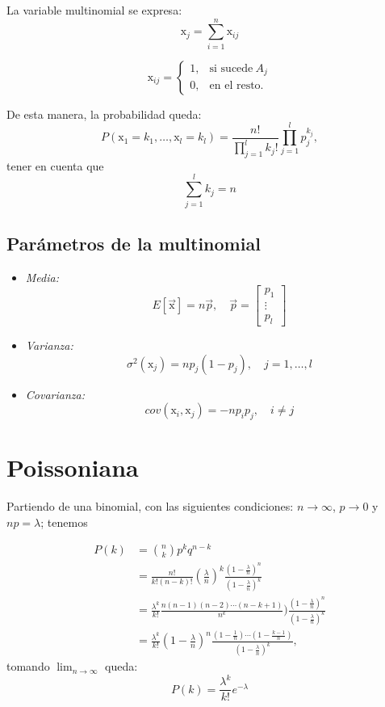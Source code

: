 \documentclass[openany]{book}
\begin{document}
La variable multinomial se expresa:
\begin{equation*}
  \mathrm{x}_{j}=\sum_{i=1}^{n}\mathrm{x}_{ij}
\end{equation*}

\begin{equation*}
  \mathrm{x}_{ij} = \begin{cases}
    1, & \text{si sucede}~ A_{j}\\
    0, & \text{en el resto.}
  \end{cases}
\end{equation*}

\par De esta manera, la probabilidad queda:
\begin{equation}
  \label{eq:prob-multinomial}
  P(\mathrm{x}_1=k_1,\dots,\mathrm{x}_l=k_{l})=\frac{n!}{\prod_{j=1}^{l}k_{j}!}\prod_{j=1}^{l}p^{k_{j}}_{j},
\end{equation}
tener en cuenta que $$\sum_{j=1}^{l}k_{j}=n$$

\subsection{Parámetros de la multinomial}
\begin{itemize}
  \item \emph{Media:}$$E\left[\vec{\mathrm{x}}\right]=n\vec{p},\quad\vec{p}=\begin{bmatrix}p_{1}\\
  \vdots\\
  p_{l}\end{bmatrix}$$
  \item \emph{Varianza:}$$\sigma^{2}(\mathrm{x}_{j})=np_{j}(1-p_{j}),\quad j=1,\dots,l$$
  \item \emph{Covarianza:}$$cov(\mathrm{x}_{i},\mathrm{x}_{j})=-np_{i}p_{j},\quad i\neq j$$
\end{itemize}

\section{Poissoniana}
Partiendo de una binomial, con las siguientes condiciones: $n\rightarrow\infty$, $p\rightarrow0$ y $np=\lambda$; tenemos

\begin{align*}
  P(k)&=\binom{n}{k}p^{k}q^ {n-k}\\
      &=\frac{n!}{k!(n-k)!}\left(\frac{\lambda}{n}\right)^ {k}\frac{\left(1-\frac{\lambda}{n}\right)^{n}}{\left(1-\frac{\lambda}{n}\right)^{k}}\\
      &=\frac{\lambda^{k}}{k!}\frac{n(n-1)(n-2)\cdots(n-k+1)}{n^{k}})\frac{\left(1-\frac{\lambda}{n}\right)^{n}}{\left(1-\frac{\lambda}{n}\right)^{k}}\\
      &=\frac{\lambda^{k}}{k!}\left(1-\frac{\lambda}{n}\right)^{n}\frac{\left(1-\frac{1}{n}\right)\cdots\left(1-\frac{k-1}{n}\right)}{\left(1-\frac{\lambda}{n}\right)^{k}},
\end{align*}
tomando $\lim_{n\rightarrow\infty}$ queda:
\begin{equation}
  \label{eq:prob-poissoniana}
  P(k)=\frac{\lambda^{k}}{k!}e^{-\lambda}
\end{equation}
\end{document}
